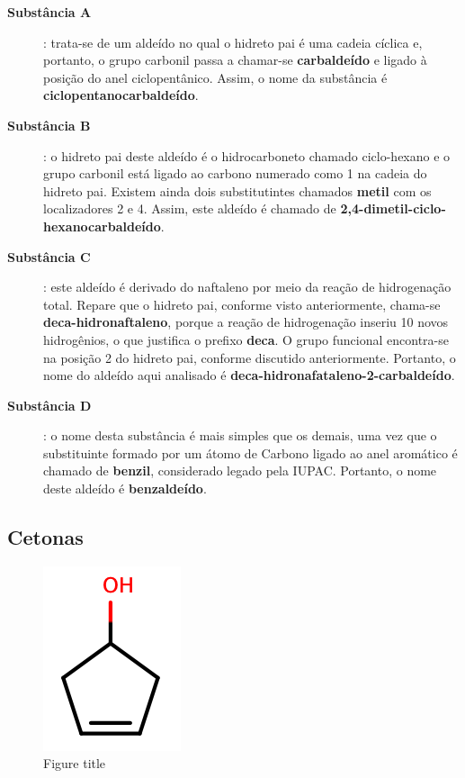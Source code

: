 \begin{description}
	\item[\textbf{Substância A}]: trata-se de um aldeído no qual o hidreto pai é uma cadeia cíclica e, portanto, o grupo carbonil passa a chamar-se \textbf{carbaldeído} e ligado à posição do anel ciclopentânico. Assim, o nome da substância é \textbf{ciclopentanocarbaldeído}. 
	\item[\textbf{Substância B}]: o hidreto pai deste aldeído é o hidrocarboneto chamado ciclo-hexano e o grupo carbonil está ligado ao carbono numerado como 1 na cadeia do hidreto pai. Existem ainda dois substitutintes chamados \textbf{metil} com os localizadores 2 e 4. Assim, este aldeído é chamado de \textbf{2,4-dimetil-ciclo-hexanocarbaldeído}. 
	\item[\textbf{Substância C}]: este aldeído é derivado do naftaleno por meio da reação de hidrogenação total. Repare que o hidreto pai, conforme visto anteriormente, chama-se \textbf{deca-hidronaftaleno}, porque a reação de hidrogenação inseriu 10 novos hidrogênios, o que justifica o prefixo \textbf{deca}. O grupo funcional encontra-se na posição 2 do hidreto pai, conforme discutido anteriormente. Portanto, o nome do aldeído aqui analisado é \textbf{deca-hidronafataleno-2-carbaldeído}.  
	\item[\textbf{Substância D}]: o nome desta substância é mais simples que os demais, uma vez que o substituinte formado por um átomo de Carbono ligado ao anel aromático é chamado de \textbf{benzil}, considerado legado pela IUPAC. Portanto, o nome deste aldeído é \textbf{benzaldeído}.
\end{description}

 \subsection{Cetonas}
 
 \begin{minipage}{\textwidth} 
 	\begin{figure}[H]
 		\caption{\label{fig:label} Figure title}
 		\includegraphics[width=0.25\linewidth]{imagens/cpd.png}
 	\end{figure}
 \end{minipage}
